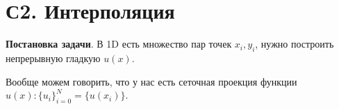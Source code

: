 \section{С2. Интерполяция}

\textbf{Постановка задачи}. В 1D есть множество пар точек ${x_i, y_i}$, нужно построить непрерывную гладкую $u(x)$. 

Вообще можем говорить, что у нас есть сеточная проекция функции $u(x) \colon  \{u_i\}_{i=0}^{N} = \{u(x_i)\}$.